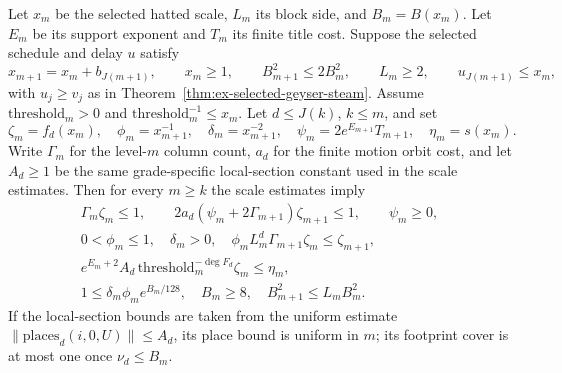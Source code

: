 \begin{proposition}
\label{prop:ex-geyser-service-fields}
Let $x_m$ be the selected hatted scale, $L_m$ its block side, and $B_m=B(x_m)$. Let $E_m$ be its support exponent and $T_m$ its finite title cost. Suppose the selected schedule and delay $u$ satisfy
\[
 x_{m+1}=x_m+b_{J(m+1)},\qquad x_m\geq1,
 \qquad B_{m+1}^2\leq2B_m^2,\qquad L_m\geq2,\qquad u_{J(m+1)}\leq x_m,
\]
with $u_j\geq v_j$ as in Theorem~\ref{thm:ex-selected-geyser-steam}. Assume $\mathrm{threshold}_m>0$ and $\mathrm{threshold}_m^{-1}\leq x_m$. Let $d\leq J(k)$, $k\leq m$, and set
\[
 \zeta_m=f_d(x_m),\quad \phi_m=x_{m+1}^{-1},\quad
 \delta_m=x_{m+1}^{-2},\quad \psi_m=2e^{E_{m+1}}T_{m+1},\quad
 \eta_m=s(x_m).
\]
Write $\Gamma_m$ for the level-$m$ column count, $a_d$ for the finite motion orbit cost, and let $A_d\geq1$ be the same grade-specific local-section constant used in the scale estimates. Then for every $m\geq k$ the scale estimates imply
\begin{gather*}
 \Gamma_m\zeta_m\leq1,\qquad
 2a_d(\psi_m+2\Gamma_{m+1})\zeta_{m+1}\leq1,\qquad \psi_m\geq0,\\
 0<\phi_m\leq1,\quad \delta_m>0,\quad
 \phi_m L_m^d\Gamma_{m+1}\zeta_m\leq\zeta_{m+1},\\
 e^{E_m+2}A_d\,\mathrm{threshold}_m^{-\deg F_d}\zeta_m\leq\eta_m,\\
 1\leq\delta_m\phi_m e^{B_m/128},\quad B_m\geq8,\quad B_{m+1}^2\leq L_mB_m^2.
\end{gather*}
If the local-section bounds are taken from the uniform estimate
$\|\mathrm{places}_d(i,0,U)\|\leq A_d$, its place bound is uniform in $m$;
its footprint cover is at most one once $\nu_d\leq B_m$.
\end{proposition}


